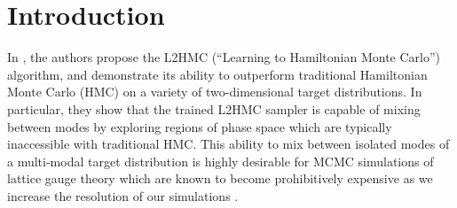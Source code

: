 \documentclass{article} %
\begin{document}
%  
\section{\label{sec:introduction}Introduction}
In \citet{levy2017}, the authors propose the L2HMC (``Learning to Hamiltonian Monte Carlo'') algorithm, and demonstrate
its ability to outperform traditional Hamiltonian Monte Carlo (HMC) on a variety of two-dimensional target
distributions.
%
In particular, they show that the trained L2HMC sampler is capable of mixing between modes by exploring regions of phase space which are typically inaccessible with traditional HMC.
%
This ability to mix between isolated modes of a multi-modal target distribution is highly desirable for MCMC simulations of lattice gauge theory which are known to become prohibitively expensive as we increase the resolution of our simulations \cite{schaefer2009investigating,cossu2018testing}.
%
%
\end{document}
